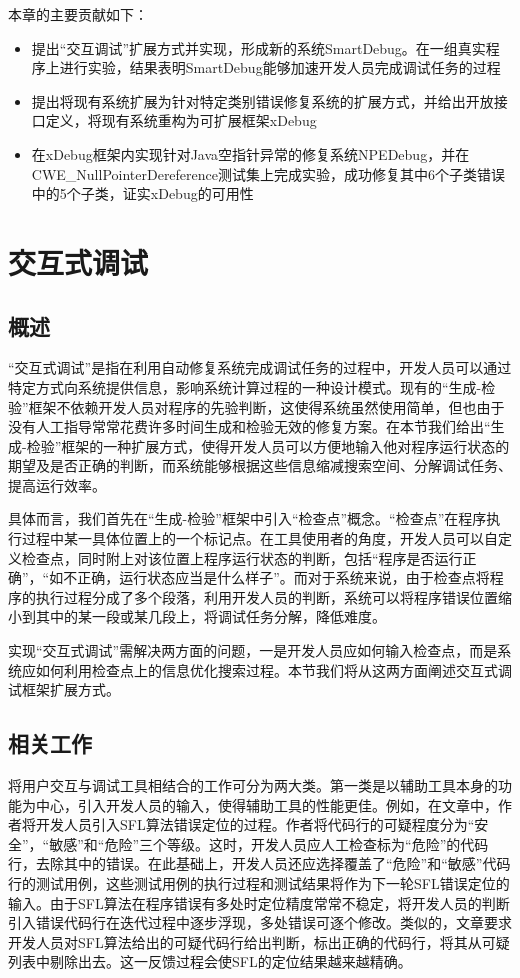 本章的主要贡献如下：
\begin{itemize}
	\item 提出“交互调试”扩展方式并实现，形成新的系统SmartDebug。在一组真实程序上进行实验，结果表明SmartDebug能够加速开发人员完成调试任务的过程
	\item 提出将现有系统扩展为针对特定类别错误修复系统的扩展方式，并给出开放接口定义，将现有系统重构为可扩展框架xDebug
	\item 在xDebug框架内实现针对Java空指针异常的修复系统NPEDebug，并在CWE\_NullPointerDereference测试集上完成实验，成功修复其中6个子类错误中的5个子类，证实xDebug的可用性
\end{itemize}

\section{交互式调试}%
\subsection{概述}%

“交互式调试”是指在利用自动修复系统完成调试任务的过程中，开发人员可以通过特定方式向系统提供信息，影响系统计算过程的一种设计模式。现有的“生成-检验”框架不依赖开发人员对程序的先验判断，这使得系统虽然使用简单，但也由于没有人工指导常常花费许多时间生成和检验无效的修复方案。在本节我们给出“生成-检验”框架的一种扩展方式，使得开发人员可以方便地输入他对程序运行状态的期望及是否正确的判断，而系统能够根据这些信息缩减搜索空间、分解调试任务、提高运行效率。

具体而言，我们首先在“生成-检验”框架中引入“检查点”概念。“检查点”在程序执行过程中某一具体位置上的一个标记点。在工具使用者的角度，开发人员可以自定义检查点，同时附上对该位置上程序运行状态的判断，包括“程序是否运行正确”，“如不正确，运行状态应当是什么样子”。而对于系统来说，由于检查点将程序的执行过程分成了多个段落，利用开发人员的判断，系统可以将程序错误位置缩小到其中的某一段或某几段上，将调试任务分解，降低难度。

实现“交互式调试”需解决两方面的问题，一是开发人员应如何输入检查点，而是系统应如何利用检查点上的信息优化搜索过程。本节我们将从这两方面阐述交互式调试框架扩展方式。

\subsection{相关工作}%

将用户交互与调试工具相结合的工作可分为两大类。第一类是以辅助工具本身的功能为中心，引入开发人员的输入，使得辅助工具的性能更佳。例如，在文章\cite{IPSETFUL}中，作者将开发人员引入SFL算法错误定位的过程。作者将代码行的可疑程度分为“安全”，“敏感”和“危险”三个等级。这时，开发人员应人工检查标为“危险”的代码行，去除其中的错误。在此基础上，开发人员还应选择覆盖了“危险”和“敏感”代码行的测试用例，这些测试用例的执行过程和测试结果将作为下一轮SFL错误定位的输入。由于SFL算法在程序错误有多处时定位精度常常不稳定，将开发人员的判断引入错误代码行在迭代过程中逐步浮现，多处错误可逐个修改。类似的，文章\cite{hongyu-fl}要求开发人员对SFL算法给出的可疑代码行给出判断，标出正确的代码行，将其从可疑列表中剔除出去。这一反馈过程会使SFL的定位结果越来越精确。

